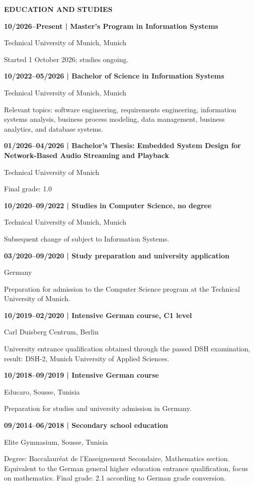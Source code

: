 \documentclass[10pt,a4paper]{article}
\newcommand{\sectiontitle}[1]{%
  \vspace{6pt}%
  \noindent\hspace{1.1em}\colorbox{white}{\bfseries\MakeUppercase{#1}}\par
  \vspace{1pt}%
}
\newenvironment{cvsection}[1]{%
  \Needspace{5\baselineskip}%
  \sectiontitle{#1}%
  \begin{lrbox}{\cvsectionbox}%
    \begin{minipage}{\dimexpr\textwidth-2\fboxsep-2\fboxrule-4pt\relax}%
    \vspace{2pt}
}{%
    \vspace{2pt}
    \end{minipage}%
  \end{lrbox}%
  \noindent\fbox{\usebox{\cvsectionbox}}%
  \par
}
\newcommand{\educationitem}[3]{%
  \textbf{#1 | #2}\par
  #3\par
}
\begin{document}
\begin{cvsection}{Education and Studies}
\educationitem{10/2026--Present}{Master's Program in Information Systems}{Technical University of Munich, Munich}
Started 1 October 2026; studies ongoing.

\vspace{2pt}
\educationitem{10/2022--05/2026}{Bachelor of Science in Information Systems}{Technical University of Munich, Munich}
Relevant topics: software engineering, requirements engineering, information systems analysis, business process modeling, data management, business analytics, and database systems.

\vspace{2pt}
\educationitem{01/2026--04/2026}{Bachelor's Thesis: Embedded System Design for Network-Based Audio Streaming and Playback}{Technical University of Munich}
Final grade: 1.0

\vspace{2pt}
\educationitem{10/2020--09/2022}{Studies in Computer Science, no degree}{Technical University of Munich, Munich}
Subsequent change of subject to Information Systems.

\vspace{2pt}
\educationitem{03/2020--09/2020}{Study preparation and university application}{Germany}
Preparation for admission to the Computer Science program at the Technical University of Munich.

\vspace{2pt}
\educationitem{10/2019--02/2020}{Intensive German course, C1 level}{Carl Duisberg Centrum, Berlin}
University entrance qualification obtained through the passed DSH examination, result: DSH-2, Munich University of Applied Sciences.

\vspace{2pt}
\educationitem{10/2018--09/2019}{Intensive German course}{Educaro, Sousse, Tunisia}
Preparation for studies and university admission in Germany.

\vspace{2pt}
\educationitem{09/2014--06/2018}{Secondary school education}{Elite Gymnasium, Sousse, Tunisia}
Degree: Baccalauréat de l'Enseignement Secondaire, Mathematics section. Equivalent to the German general higher education entrance qualification, focus on mathematics. Final grade: 2.1 according to German grade conversion.
\end{cvsection}
\end{document}
